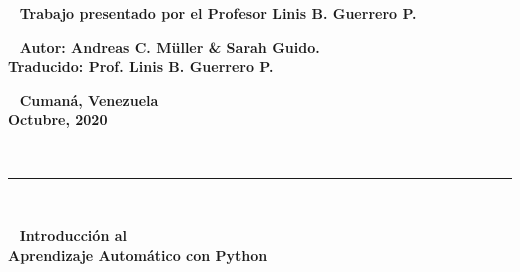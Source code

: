 	\begin{center}
		{\ {\bf \vspace{0.2cm}  Trabajo presentado por el Profesor Linis B. Guerrero P.\\ 
				\vspace{0.2cm} 	
		}}
	\end{center}
	
	
	
	
	\begin{center}
		{\ {\bf \vspace{0.2cm}  		Autor: Andreas C. Müller \& Sarah Guido.\\
			                            Traducido: Prof. Linis B. Guerrero P.\\
				\vspace{0.2cm} 	
		}}
	\end{center}
	
	
	\begin{center}
		{\ {\bf \vspace{0.2cm}  	Cumaná, Venezuela \\
				Octubre, 2020 \\
				\vspace{0.2cm} 
		}}
	\end{center}
	
	
	
	
	
	
	
	\thispagestyle{empty}~~\vspace{-0.2cm}
	
	
	
	
	
	
	
	
	
	
	
	\vskip 5cm \rule{\linewidth}{1.3pt}\\[0.5cm]
	\begin{center}
		{\  \LARGE  {\bf \vspace{0.2cm} Introducción al\\				 
				\vspace{0.2cm} Aprendizaje Automático con  Python \\ }}						
	\end{center}		
	
